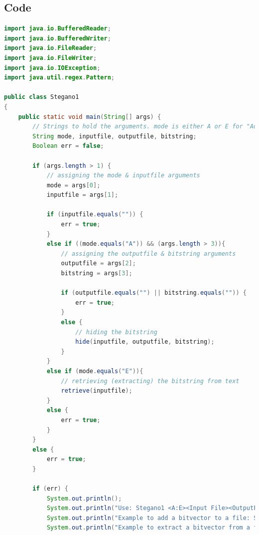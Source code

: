 \documentclass[a4paper]{article}
\begin{document}
\subsection{Code}
\begin{lstlisting}[language=Java]
import java.io.BufferedReader;
import java.io.BufferedWriter;
import java.io.FileReader;
import java.io.FileWriter;
import java.io.IOException;
import java.util.regex.Pattern;

public class Stegano1
{
    public static void main(String[] args) {
        // Strings to hold the arguments. mode is either A or E for "Add" or "Extract". 
        String mode, inputfile, outputfile, bitstring;  
        Boolean err = false;                                                    // Boolean to tell if the arguments were passed correctly or not 

        if (args.length > 1) {                                                  // checking that at least one argument was passed to main
            // assigning the mode & inputfile arguments
            mode = args[0];
            inputfile = args[1];
                
            if (inputfile.equals("")) {                                         // checking that an inputfile was provided (String was not empty)
                err = true;
            }
            else if ((mode.equals("A")) && (args.length > 3)){                  // checking if the mode is "Add" & that the number of arguments provided was greater than 3
                // assigning the outputfile & bitstring arguments
                outputfile = args[2];
                bitstring = args[3];
        
                if (outputfile.equals("") || bitstring.equals("")) {            // checking that neither the outputfile nor bitstring were empty strings
                    err = true;
                }
                else {
                    // hiding the bitstring
                    hide(inputfile, outputfile, bitstring);
                }
            }
            else if (mode.equals("E")){                                         // checking if the mode is "Extract"
                // retrieving (extracting) the bitstring from text   
                retrieve(inputfile);   
            }
            else {
                err = true;
            }
        }
        else {
            err = true;
        }
        
        if (err) {
            System.out.println();
            System.out.println("Use: Stegano1 <A:E><Input File><OutputFile><Bitstring>");
            System.out.println("Example to add a bitvector to a file: Stegano1 A inp.txt out.txt 0010101");
            System.out.println("Example to extract a bitvector from a file: Stegano1 E inp.txt");
            

\end{lstlisting}
\end{document}
